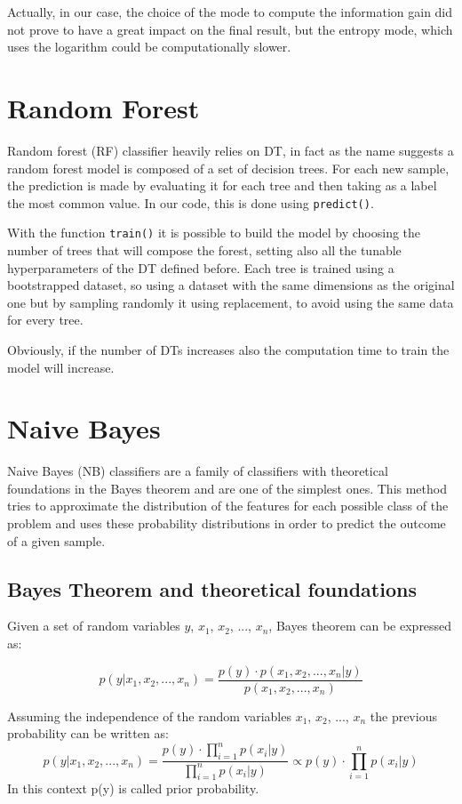 \documentclass{Configuration_Files/PoliMi3i_thesis}
\begin{document}
Actually, in our case, the choice of the mode to compute the information gain did not prove to have a great impact on the final result, but the entropy mode, which uses the logarithm could be computationally slower.

\section{Random Forest}
Random forest (RF) classifier heavily relies on DT, in fact as the name suggests a random forest model is composed of a set of decision trees. For each new sample, the prediction is made by evaluating it for each tree and then taking as a label the most common value. In our code, this is done using \verb|predict()|.

With the function \verb|train()| it is possible to build the model by choosing the number of trees that will compose the forest, setting also all the tunable hyperparameters of the DT defined before. Each tree is trained using a bootstrapped dataset, so using a dataset with the same dimensions as the original one but by sampling randomly it using replacement, to avoid using the same data for every tree.

Obviously, if the number of DTs increases also the computation time to train the model will increase.

\section{Naive Bayes}
Naive Bayes (NB) classifiers are a family of classifiers with theoretical foundations in the Bayes theorem and are one of the simplest ones. This method tries to approximate the distribution of the features for each possible class of the problem and uses these probability distributions in order to predict the outcome of a given sample.
\subsection{Bayes Theorem and theoretical foundations}
Given a set of random variables $y$, $x_1$, $x_2$, ..., $x_n$, Bayes theorem can be expressed as:

$$p(y|x_1, x_2, ..., x_n) = \frac{p(y) \cdot p(x_1, x_2, ..., x_n|y)}{p(x_1, x_2, ..., x_n)}$$

Assuming the independence of the random variables $x_1$, $x_2$, ..., $x_n$ the previous probability can be written as:
$$p(y|x_1, x_2, ..., x_n) = \frac{p(y) \cdot \prod\limits_{i=1}^{n}{p(x_i|y)}}{\prod\limits_{i=1}^{n}{p(x_i|y)}} \propto p(y) \cdot \prod\limits_{i=1}^{n}{p(x_i|y)}$$
In this context p(y) is called prior probability.
\end{document}
